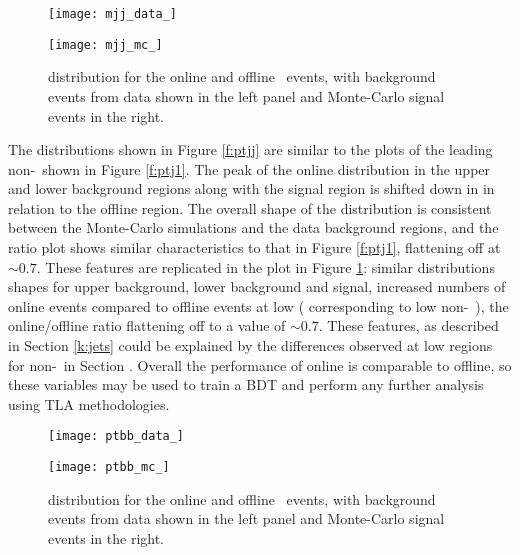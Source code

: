         \begin{figure}[h]
            \centering
            \begin{minipage}[h]{0.48\linewidth}
                \texttt{[image: mjj\_data\_]}
            \end{minipage}
            \quad
            \begin{minipage}[h]{0.48\linewidth}
                \texttt{[image: mjj\_mc\_]}
            \end{minipage}
            \caption[Comparison of the \mjj distribution of the \VBFHBB\ events for HLT and offline objects]{\mjj distribution for the online and offline \VBFHBB\ events, with background events from data shown in the left panel and Monte-Carlo signal events in the right.}
            \label{f:mjj}
        \end{figure}

        The \ptjj distributions shown in Figure \ref{f:ptjj} are similar to the plots of the leading non-\bjet\ shown in Figure \ref{f:ptj1}. The peak of the online distribution in the upper and lower background regions along with the signal region is shifted down in \ptjj in relation to the offline region. The overall shape of the distribution is consistent between the Monte-Carlo simulations and the data background regions, and the ratio plot shows similar characteristics to that in Figure \ref{f:ptj1}, flattening off at $\sim0.7$. These features are replicated in the \mjj plot in Figure \ref{f:mjj}: similar distributions shapes for upper background, lower background and signal, increased numbers of online events compared to offline events at low \mjj ( corresponding to low non-\bjet\ \pt), the online/offline ratio flattening off to a value of $\sim0.7$. These features, as described in Section \ref{k:jets} could be explained by the differences observed at low \pt regions for non-\bjets\ in Section \label{OP:leadingnonb}. Overall the performance of online is comparable to offline, so these variables may be used to train a BDT and perform any further analysis using TLA methodologies.

        \begin{figure}[h]
            \centering
            \begin{minipage}[h]{0.48\linewidth}
                \texttt{[image: ptbb\_data\_]}
            \end{minipage}
            \quad
            \begin{minipage}[h]{0.48\linewidth}
                \texttt{[image: ptbb\_mc\_]}
            \end{minipage}
            \caption[Comparison of the \ptbb distribution of the \VBFHBB\ events for HLT and offline objects]{\ptbb distribution for the online and offline \VBFHBB\ events, with background events from data shown in the left panel and Monte-Carlo signal events in the right.}
            \label{f:ptbb}
        \end{figure}

